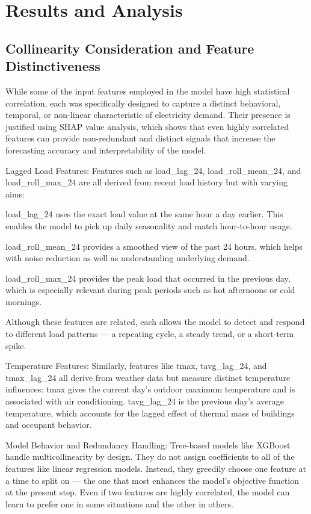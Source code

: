 \documentclass{ifacconf}
\begin{document}
\section{Results and Analysis}
\subsection*{Collinearity Consideration and Feature Distinctiveness}

While some of the input features employed in the model have high statistical correlation, each was specifically designed to capture a distinct behavioral, temporal, or non-linear characteristic of electricity demand. Their presence is justified using SHAP value analysis, which shows that even highly correlated features can provide non-redundant and distinct signals that increase the forecasting accuracy and interpretability of the model.

Lagged Load Features:
Features such as load_lag_24, load_roll_mean_24, and load_roll_max_24 are all derived from recent load history but with varying aims:

load_lag_24 uses the exact load value at the same hour a day earlier. This enables the model to pick up daily seasonality and match hour-to-hour usage.

load_roll_mean_24 provides a smoothed view of the past 24 hours, which helps with noise reduction as well as understanding underlying demand.

load_roll_max_24 provides the peak load that occurred in the previous day, which is especially relevant during peak periods such as hot afternoons or cold mornings.

Although these features are related, each allows the model to detect and respond to different load patterns — a repeating cycle, a steady trend, or a short-term spike.

Temperature Features:
Similarly, features like tmax, tavg_lag_24, and tmax_lag_24 all derive from weather data but measure distinct temperature influences:
tmax gives the current day's outdoor maximum temperature and is  associated with air conditioning. tavg_lag_24 is the previous day's average temperature, which accounts for the lagged effect of thermal mass of buildings and occupant behavior.

Model Behavior and Redundancy Handling:
Tree-based models like XGBoost handle multicollinearity by design. They do not assign coefficients to all of the features like linear regression models. Instead, they greedily choose one feature at a time to split on — the one that most enhances the model's objective function at the present step. Even if two features are highly correlated, the model can learn to prefer one in some situations and the other in others. 
\end{document}
